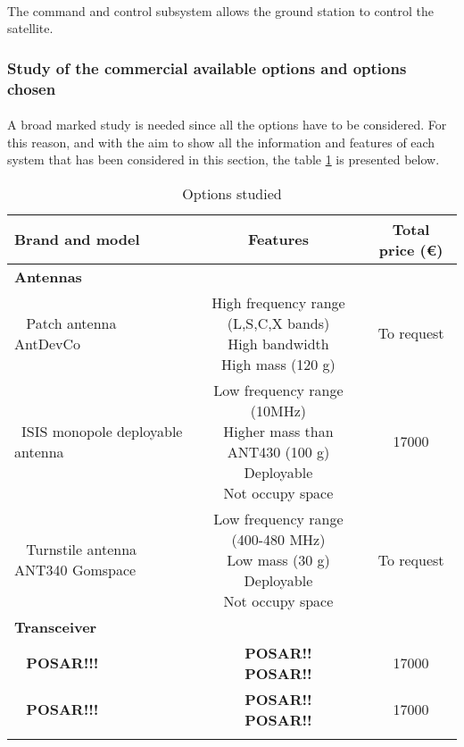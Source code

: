 \paragraph{}The command and control subsystem allows the ground station to control the satellite.


\subsubsection{Study of the commercial available options and options chosen}
\paragraph{}A broad marked study is needed since all the options have to be considered. For this reason, and with the aim to show all the information and features of each system that has been considered in this section, the table \ref{payloadoptions} is presented below.

\begin{longtable}{| l | c | c | }
\hline
\rowcolor[gray]{0.80}	\textbf{Brand and model} &  \textbf{Features}     & \textbf{Total price (\euro)}   \\
\hline
\endfirsthead

\rowcolor[gray]{0.85} \textbf{Antennas} &  &  \\
	   ~	Patch antenna AntDevCo & \makecell{High frequency range (L,S,C,X bands)\\ High bandwidth \\High mass (120 g)} & To request \\
	   \hline
	  ~ISIS monopole deployable antenna & \makecell{Low frequency range (10MHz) \\ Higher mass than ANT430 (100 g) \\ Deployable \\ Not occupy space} & 17000 \\
	   \hline
	  ~	Turnstile antenna ANT340 Gomspace & \makecell{Low frequency range (400-480 MHz) \\ Low mass (30 g) \\ Deployable \\ Not occupy space} & To request \\
	   \hline
	\hline

\rowcolor[gray]{0.85} \textbf{Transceiver} &  &  \\
	   ~	\textbf{POSAR!!!} & \makecell{\textbf{POSAR!!}\\ \textbf{POSAR!!}} & 17000 \\
	   \hline
	   ~	\textbf{POSAR!!!} & \makecell{\textbf{POSAR!!}\\ \textbf{POSAR!!}} & 17000 \\
	   \hline
	\hline
	
\caption{Options studied}
\label{payloadoptions}
\end{longtable}

